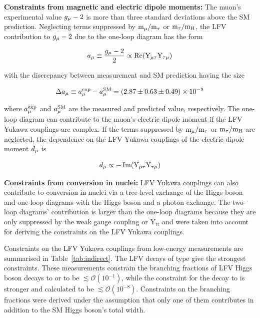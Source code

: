 \textbf{Constraints from magnetic and electric dipole moments:} The muon's experimental value $g_{\mu}-2$ is more than three standard deviations above the SM prediction. Neglecting terms suppressed by $\text{m}_{\mu} / \text{m}_{\tau}$ or $\text{m}_{\tau} / \text{m}_\text{H}$, the LFV contribution to $g_{\mu}-2$ due to the one-loop diagram has the form

\begin{equation}
  a_{\mu} \equiv \frac{g_{\mu}-2}{2} \propto \operatorname{Re}(\text{Y}_{\mu\tau} \text{Y}_{\tau\mu})
\end{equation}

with the discrepancy between measurement and SM prediction having the size

\begin{equation}
  \Delta a_{\mu} \equiv a_{\mu}^{\text{exp}}-a_{\mu}^{\text{SM}}=(2.87 \pm 0.63 \pm 0.49) \times 10^{-9}
\end{equation}

where $a_{\mu}^{\text{exp}}$ and $a_{\mu}^{\text{SM}}$ are the measured and predicted value, respectively. The one-loop diagram can contribute to the muon's electric dipole moment if the LFV Yukawa couplings are complex. If the terms suppressed by $\text{m}_{\mu} / \text{m}_{\tau}$ or $\text{m}_{\tau} / \text{m}_\text{H}$ are neglected, the dependence on the LFV Yukawa couplings of the electric dipole moment $d_{\mu}$ is

\begin{equation}
  d_{\mu} \propto-\operatorname{Im}(\text{Y}_{\mu\tau} \text{Y}_{\tau\mu})
\end{equation}

\textbf{Constraints from \mte conversion in nuclei:} LFV Yukawa couplings can also contribute to \mte conversion in nuclei via a tree-level exchange of the Higgs boson and one-loop diagrams with the Higgs boson and a photon exchange. The two-loop diagrams' contribution is larger than the one-loop diagrams because they are only suppressed by the weak gauge coupling or $\mathrm{Y_{tt}}$ and were taken into account for deriving the constraints on the LFV Yukawa couplings.

Constraints on the LFV Yukawa couplings from low-energy measurements are summarised in Table~\ref{tab:indirect}. The LFV decays of type \liljg give the strongest constraints. These measurements constrain the branching fractions of LFV Higgs boson decays to \mutau or \etau to be $\lesssim \mathcal{O}(10^{-1})$, while the constraint for the decay to \emm is stronger and calculated to be $\lesssim \mathcal{O}(10^{-8})$. Constraints on the branching fractions were derived under the assumption that only one of them contributes in addition to the SM Higgs boson's total width.

